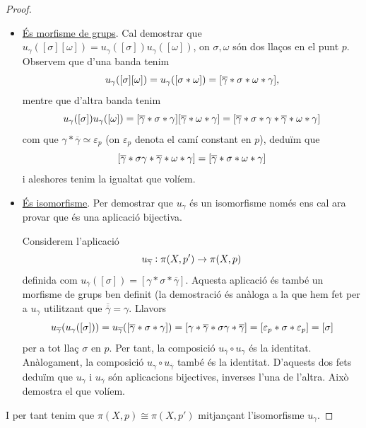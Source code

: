 \documentclass[../main.tex]{subfiles}
\begin{document}
\begin{proof}
\begin{itemize}
    \item \underline{És morfisme de grups}. Cal demostrar que $u_\gamma([\sigma][\omega]) = u_\gamma([\sigma])u_\gamma([\omega])$, on $\sigma,\omega$ són dos llaços en el punt $p$. Observem que d'una banda tenim
    \begin{equation}
        \notag
        u_\gamma([\sigma][\omega]) = u_\gamma([\sigma*\omega])=[\overline{\gamma}*\sigma*\omega*\gamma],
    \end{equation}
    mentre que d'altra banda tenim
    \begin{equation}
        \notag
        u_\gamma([\sigma])u_\gamma([\omega])=[\overline{\gamma}*\sigma*\gamma][\overline{\gamma}*\omega*\gamma] = [\overline{\gamma}*\sigma*\gamma*\overline{\gamma}*\omega*\gamma]
    \end{equation}
    com que $\gamma*\overline{\gamma}\simeq \varepsilon_p$ (on $\varepsilon_p$ denota el camí constant en $p$), deduïm que
    \begin{equation}
        \notag
        [\overline{\gamma}*\sigma\gamma*\overline{\gamma}*\omega*\gamma] = [\overline{\gamma}*\sigma*\omega*\gamma]
    \end{equation}
    i aleshores tenim la igualtat que volíem.
    \item \underline{És isomorfisme}. Per demostrar que $u_\gamma$ és un isomorfisme només ens cal ara provar que és una aplicació bijectiva. 
    
    Considerem l'aplicació
    \begin{equation}
        \notag
        u_{\overline{\gamma}}:\pi(X,p')\rightarrow \pi(X,p)
    \end{equation}
    definida com $u_{\overline{\gamma}}([\sigma])= [\gamma*\sigma*\overline{\gamma}]$. Aquesta aplicació és també un morfisme de grups ben definit (la demostració és anàloga a la que hem fet per a $u_\gamma$ utilitzant que $\overline{\overline{\gamma}} = \gamma$. Llavors
    \begin{equation}
        \notag
        u_{\overline{\gamma}}(u_\gamma([\sigma])) = u_{\overline{\gamma}}([\overline{\gamma}*\sigma*\gamma]) = [\gamma*\overline{\gamma}*\sigma\gamma*\overline{\gamma}] = [\varepsilon_p*\sigma*\varepsilon_p]=[\sigma]
    \end{equation}
    per a tot llaç $\sigma$ en $p$. Per tant, la composició $u_{\overline{\gamma}}\circ u_\gamma$ és la identitat. Anàlogament, la composició $u_\gamma\circ u_{\overline{\gamma}}$ també és la identitat. D'aquests dos fets deduïm que $u_\gamma$ i $u_{\overline{\gamma}}$ són aplicacions bijectives, inverses l'una de l'altra. Això demostra el que volíem.
\end{itemize}
I per tant tenim que $\pi(X,p)\cong\pi(X,p')$ mitjançant l'isomorfisme $u_\gamma$.
\end{proof}
\end{document}
